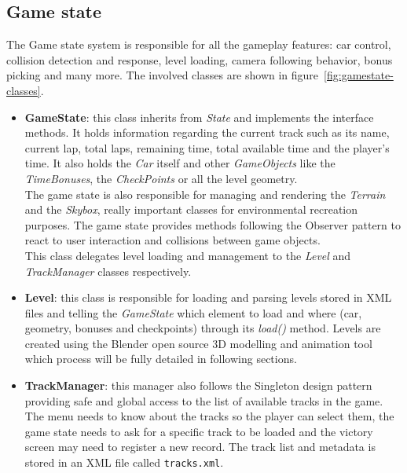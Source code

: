 \subsection{Game state}

The Game state system is responsible for all the gameplay features: car control, collision detection
and response, level loading, camera following behavior, bonus picking and many more. The involved
classes are shown in figure~\ref{fig:gamestate-classes}.


\begin{itemize}
	\item \textbf{GameState}: this class inherits from \textit{State} and implements the interface
	methods. It holds information regarding the current track such as its name, current lap, total
	laps, remaining time, total available time and the player's time. It also holds the \textit{Car}
	itself and other \textit{GameObjects} like the \textit{TimeBonuses}, the \textit{CheckPoints}
	or all the level geometry.\\
	
	The game state is also responsible for managing and rendering the \textit{Terrain} and the
	\textit{Skybox}, really important classes for environmental recreation purposes. The game state
	provides methods following the Observer pattern \cite{gamm94} to react to user interaction and
	collisions between game objects.\\
	
	This class delegates level loading and management to the \textit{Level} and \textit{TrackManager}
	classes respectively.
	
	\item \textbf{Level}: this class is responsible for loading and parsing levels stored in XML files and telling
	the \textit{GameState} which element to load and where (car, geometry, bonuses and checkpoints) through
	its \textit{load()} method. Levels are created using the Blender open source 3D modelling and animation
	tool~\cite{hess07} which process will be fully detailed in following sections.
	\item \textbf{TrackManager}: this manager also follows the Singleton design pattern \cite{gamm94}
	providing safe and global access to the list of available tracks in the game. The menu needs to know about
	the tracks so the player can select them, the game state needs to ask for a specific track to be loaded
	and the victory screen may need to register a new record. The track list and metadata is stored
	in an XML file called \texttt{tracks.xml}.
	

\end{itemize}
